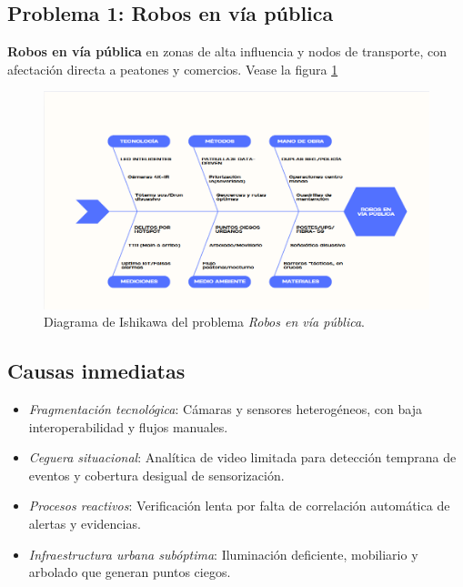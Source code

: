 \documentclass[12pt,a4paper]{article}
\begin{document}
\subsection*{Problema 1: Robos en vía pública}
\textbf{Robos en vía pública} en zonas de alta influencia y nodos de transporte, con afectación directa a peatones y comercios. Vease la figura \ref{fig:mapa-problemas-seguridad}
\begin{figure}[htbp] %
  \centering
  \includegraphics[width=\linewidth, keepaspectratio]{ishikawa_p1.png}
  \caption{Diagrama de Ishikawa del problema \textit{Robos en vía pública}.}
  \label{fig:mapa-problemas-seguridad}
\end{figure}

\subsection*{Causas inmediatas}
\begin{itemize}
    \item \textit{Fragmentación tecnológica}: Cámaras y sensores heterogéneos, con baja interoperabilidad y flujos manuales.
    \item \textit{Ceguera situacional}: Analítica de video limitada para detección temprana de eventos y cobertura desigual de sensorización.
    \item \textit{Procesos reactivos}: Verificación lenta por falta de correlación automática de alertas y evidencias.
    \item \textit{Infraestructura urbana subóptima}: Iluminación deficiente, mobiliario y arbolado que generan puntos ciegos.
\end{itemize}
\end{document}
